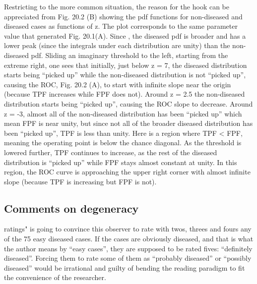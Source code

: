 \documentclass[
]{book}
\begin{document}
Restricting to the more common situation, the reason for the hook can be appreciated from Fig. 20.2 (B) showing the pdf functions for non-diseased and diseased cases as functions of z. The plot corresponds to the same parameter value that generated Fig. 20.1(A). Since , the diseased pdf is broader and has a lower peak (since the integrals under each distribution are unity) than the non-diseased pdf. Sliding an imaginary threshold to the left, starting from the extreme right, one sees that initially, just below z = 7, the diseased distribution starts being ``picked up'' while the non-diseased distribution is not ``picked up'', causing the ROC, Fig. 20.2 (A), to start with infinite slope near the origin (because TPF increases while FPF does not). Around z = 2.5 the non-diseased distribution starts being ``picked up'', causing the ROC slope to decrease. Around z = -3, almost all of the non-diseased distribution has been ``picked up'' which mean FPF is near unity, but since not all of the broader diseased distribution has been ``picked up'', TPF is less than unity. Here is a region where TPF \textless{} FPF, meaning the operating point is below the chance diagonal. As the threshold is lowered further, TPF continues to increase, as the rest of the diseased distribution is ``picked up'' while FPF stays almost constant at unity. In this region, the ROC curve is approaching the upper right corner with almost infinite slope (because TPF is increasing but FPF is not).

\hypertarget{comments-on-degeneracy}{%
\subsection{Comments on degeneracy}\label{comments-on-degeneracy}}

ratings" is going to convince this observer to rate with twos, threes and fours any of the 75 easy diseased cases. If the cases are obviously diseased, and that is what the author means by ``easy cases'', they are supposed to be rated fives: ``definitely diseased''. Forcing them to rate some of them as ``probably diseased'' or ``possibly diseased'' would be irrational and guilty of bending the reading paradigm to fit the convenience of the researcher.
\end{document}
